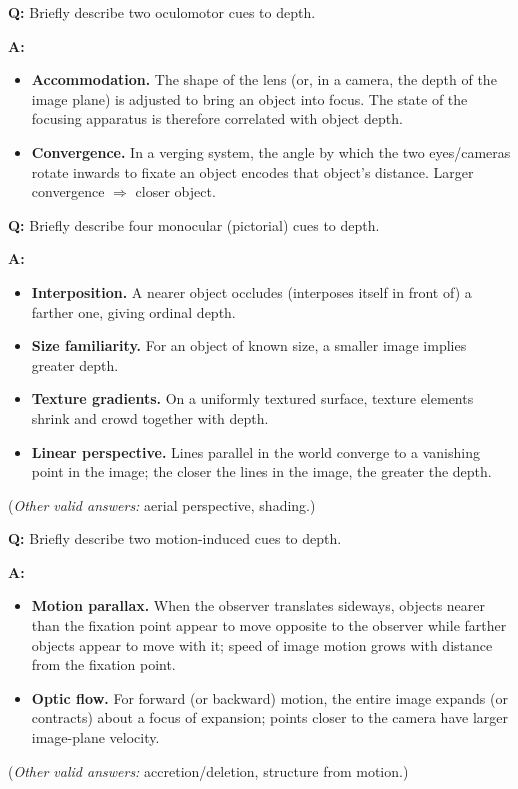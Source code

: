\begin{exbox}
\textbf{Q:} Briefly describe two oculomotor cues to depth.

\textbf{A:}
\begin{itemize}
  \item \textbf{Accommodation.} The shape of the lens (or, in a camera, the depth of the image plane) is adjusted to bring an object into focus. The state of the focusing apparatus is therefore correlated with object depth.
  \item \textbf{Convergence.} In a verging system, the angle by which the two eyes/cameras rotate inwards to fixate an object encodes that object's distance. Larger convergence $\Rightarrow$ closer object.
\end{itemize}
\end{exbox}

\begin{exbox}
\textbf{Q:} Briefly describe four monocular (pictorial) cues to depth.

\textbf{A:}
\begin{itemize}
  \item \textbf{Interposition.} A nearer object occludes (interposes itself in front of) a farther one, giving ordinal depth.
  \item \textbf{Size familiarity.} For an object of known size, a smaller image implies greater depth.
  \item \textbf{Texture gradients.} On a uniformly textured surface, texture elements shrink and crowd together with depth.
  \item \textbf{Linear perspective.} Lines parallel in the world converge to a vanishing point in the image; the closer the lines in the image, the greater the depth.
\end{itemize}
(\emph{Other valid answers:} aerial perspective, shading.)
\end{exbox}

\begin{exbox}
\textbf{Q:} Briefly describe two motion-induced cues to depth.

\textbf{A:}
\begin{itemize}
  \item \textbf{Motion parallax.} When the observer translates sideways, objects nearer than the fixation point appear to move opposite to the observer while farther objects appear to move with it; speed of image motion grows with distance from the fixation point.
  \item \textbf{Optic flow.} For forward (or backward) motion, the entire image expands (or contracts) about a focus of expansion; points closer to the camera have larger image-plane velocity.
\end{itemize}
(\emph{Other valid answers:} accretion/deletion, structure from motion.)
\end{exbox}

